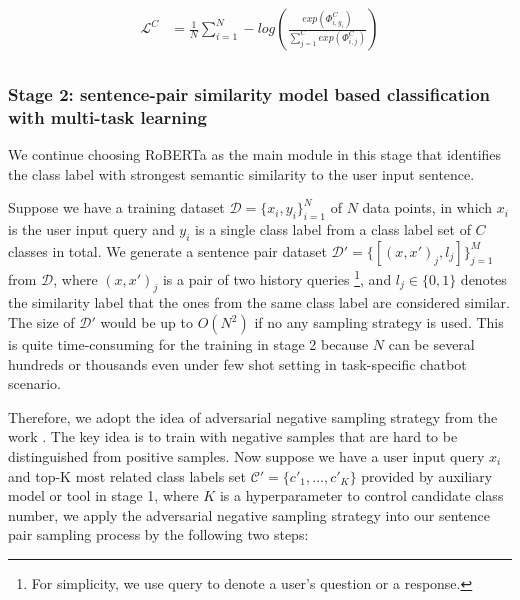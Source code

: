 \documentclass[letterpaper]{article} %
\begin{document}
  \begin{equation}
    \begin{aligned}
      \mathcal{L}^{C}&=\frac{1}{N}\sum_{i=1}^{N}-log(\frac{exp(\varPhi_{i,y_{i}}^C)}{\sum_{j=1}^{C}exp(\varPhi_{i,j}^C)}) \\
      \label{eq:classification_loss}
    \end{aligned}
  \end{equation}

  \subsubsection*{
    Stage 2: sentence-pair similarity model based classification with multi-task
    learning
  }
  We  continue choosing RoBERTa as the main module in this stage that identifies
  the class label with strongest semantic similarity to the user input sentence.

  Suppose  we have a training dataset $\mathcal{D}=\{x_{i},y_{i}\}_{i=1}^{N}$ of
  $N$  data  points,  in  which $x_{i}$ is the user input query and $y_{i}$ is a
  single  class label from a class label set of $C$ classes in total. We 
  generate            a sentence            pair            dataset
  $\mathcal{D'}=\{[(x,x')_{j},l_{j}]\}_{j=1}^{M}$ from $\mathcal{D}$,   where   $(x,   x')_{j}$  is
  a pair of two history queries \footnote{For simplicity, we use query
  to denote a user's question or a response.}, and $l_{j}\in\{0, 1\}$ denotes the
  similarity label that the ones from the same class label are considered
  similar. The size of $\mathcal{D'}$  would be up to $O(N^2)$ if no any
  sampling strategy is used.  This is quite time-consuming  for the  training
  in stage 2 because $N$ can be several hundreds or thousands even under 
  few shot setting in task-specific chatbot scenario. 

  Therefore,  we  adopt  the idea of adversarial negative sampling strategy from
  the  work  \cite{bamler2020extreme}.  The  key  idea is to train with negative
  samples  that  are hard to be distinguished from positive samples. Now suppose
  we  have  a  user  input query $x_{i}$ and top-K most related class labels set
  $\mathcal{C'}=\{c'_{1},  \dots,  c'_{K}\}$ provided by auxiliary model or tool
  in  stage  1, where $K$ is a hyperparameter to control candidate class number,
  we  apply  the  adversarial  negative sampling strategy into our sentence pair
  sampling process by the following two steps:
\end{document}
